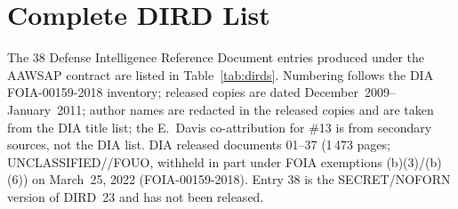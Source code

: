 \documentclass[aps,prd,twocolumn,superscriptaddress,nofootinbib,floatfix]{revtex4-2}
\begin{document}
\section{Complete DIRD List}\label{app:dirds}

The 38 Defense Intelligence Reference Document entries produced under the AAWSAP
contract are listed in Table~\ref{tab:dirds}. Numbering follows the DIA
FOIA-00159-2018 inventory; released copies are dated December~2009--January~2011;
author names are redacted in the released copies and are taken from the DIA title
list; the E.~Davis co-attribution for \#13 is from secondary sources, not the
DIA list. DIA released documents 01--37 (1\,473 pages; UNCLASSIFIED//FOUO, withheld in
part under FOIA exemptions (b)(3)/(b)(6)) on March~25, 2022 (FOIA-00159-2018).
Entry 38 is the SECRET/NOFORN version of DIRD~23 and has not been released.
\end{document}
